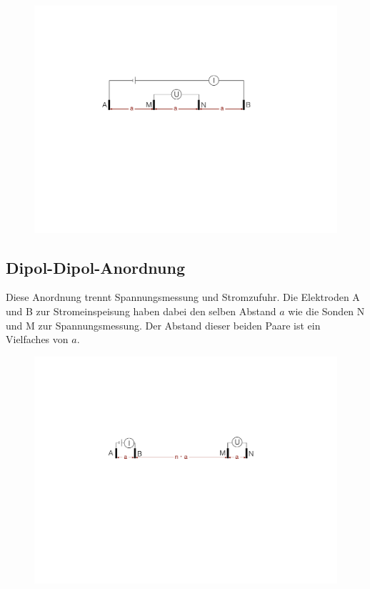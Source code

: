 \begin{figure}[H]
	\centering
	\includegraphics[width = \textwidth]{GeoelektrikBilder/WennerAnordnung}
\end{figure}



\subsection{Dipol-Dipol-Anordnung}
Diese Anordnung trennt Spannungsmessung und Stromzufuhr. Die Elektroden A und B zur Stromeinspeisung haben dabei den selben Abstand $a$ wie die Sonden N und M zur Spannungsmessung. Der Abstand dieser beiden Paare ist ein Vielfaches von $a$.

\begin{figure}[H]
	\centering
	\includegraphics[width = \textwidth]{GeoelektrikBilder/DipolDipolAnordnung}
\end{figure}


